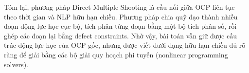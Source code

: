 Tóm lại, phương pháp Direct Multiple Shooting  là cầu nối giữa OCP liên tục theo thời gian và NLP
hữu hạn chiều.
Phương pháp chia quỹ đạo thành nhiều đoạn động lực học cục bộ, tích phân từng đoạn bằng một bộ
tích phân số, rồi ghép các đoạn lại bằng defect constraints.
Nhờ vậy, bài toán vẫn giữ được cấu trúc động lực học của OCP gốc, nhưng được viết dưới dạng hữu
hạn chiều đủ rõ ràng để giải bằng các bộ giải quy hoạch phi tuyến (nonlinear programming solvers).